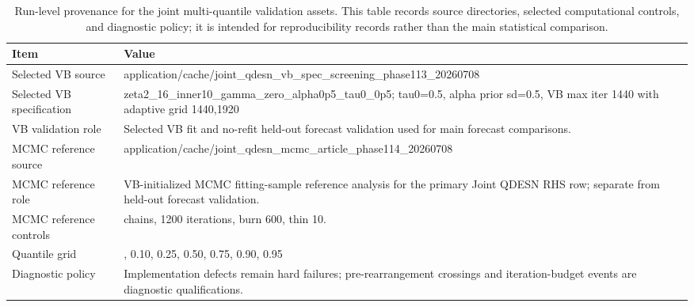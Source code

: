 \begin{table}[!htbp]
\centering
\scriptsize
\begin{tabular}{@{}>{\raggedright\arraybackslash}p{}>{\raggedright\arraybackslash}p{}@{}}
\toprule
Item & Value
\\
\midrule
Selected VB source & application/cache/joint\_qdesn\_vb\_spec\_screening\_phase113\_20260708 \\
Selected VB specification & zeta2\_16\_inner10\_gamma\_zero\_alpha0p5\_tau0\_0p5; tau0=0.5, alpha prior sd=0.5, VB max iter 1440 with adaptive grid 1440,1920 \\
VB validation role & Selected VB fit and no-refit held-out forecast validation used for main forecast comparisons. \\
MCMC reference source & application/cache/joint\_qdesn\_mcmc\_article\_phase114\_20260708 \\
MCMC reference role & VB-initialized MCMC fitting-sample reference analysis for the primary Joint QDESN RHS row; separate from held-out forecast validation. \\
MCMC reference controls & 2 chains, 1200 iterations, burn 600, thin 10. \\
Quantile grid & 0.05, 0.10, 0.25, 0.50, 0.75, 0.90, 0.95 \\
Diagnostic policy & Implementation defects remain hard failures; pre-rearrangement crossings and iteration-budget events are diagnostic qualifications. \\
\bottomrule
\end{tabular}
\caption{Run-level provenance for the joint multi-quantile validation assets. This table records source directories, selected computational controls, and diagnostic policy; it is intended for reproducibility records rather than the main statistical comparison.}
\label{tab:joint-qdesn-article-validation-protocol-provenance}
\end{table}
